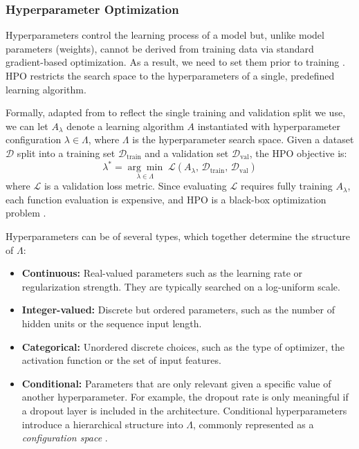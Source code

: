 \subsubsection{Hyperparameter Optimization}
\label{subsubsection:HPO}
Hyperparameters control the learning process of a model but, unlike model parameters (weights), cannot be derived from training data via standard gradient-based optimization. As a result, we need to set them prior to training \parencite{hutter2019automated}. \acf{HPO} restricts the search space to the hyperparameters of a single, predefined learning algorithm.


Formally, adapted from \textcite{AutoMLHoos} to reflect the single training and validation split we use, we can let $A_\lambda$ denote a learning algorithm $A$ instantiated with hyperparameter configuration $\lambda \in \Lambda$, where $\Lambda$ is the
hyperparameter search space. Given a dataset $\mathcal{D}$ split into a training set $\mathcal{D}_\text{train}$ and a validation set
$\mathcal{D}_\text{val}$, the \ac{HPO} objective is:
\begin{equation}
    \lambda^* = \underset{\lambda \in \Lambda}{\arg\min}\;
    \mathcal{L}\!\left(A_\lambda,\, \mathcal{D}_\text{train},\,
    \mathcal{D}_\text{val}\right)
    \label{eq:hpo}
\end{equation}
where $\mathcal{L}$ is a validation loss metric. Since evaluating $\mathcal{L}$ requires fully training $A_\lambda$, each function evaluation is expensive, and \ac{HPO} is a black-box optimization problem .

Hyperparameters can be of several types, which together determine the structure of $\Lambda$:
\begin{itemize}
    \item \textbf{Continuous:} Real-valued parameters such as the learning
    rate or regularization strength. They are typically searched on a
    log-uniform scale.
    \item \textbf{Integer-valued:} Discrete but ordered parameters, such as
    the number of hidden units or the sequence input length.
    \item \textbf{Categorical:} Unordered discrete choices, such as the
    type of optimizer, the activation function or the set of input features.
    \item \textbf{Conditional:} Parameters that are only relevant given a
    specific value of another hyperparameter. For example, the dropout rate
    is only meaningful if a dropout layer is included in the architecture.
    Conditional hyperparameters introduce a hierarchical structure into
    $\Lambda$, commonly represented as a \emph{configuration space}
    \parencite{hutter2019automated}.
\end{itemize}





